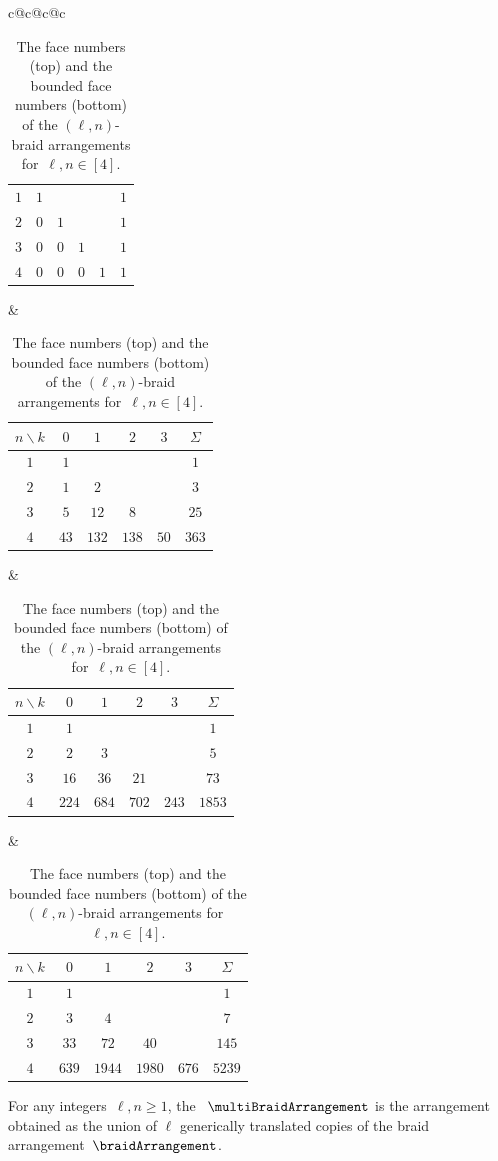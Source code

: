 \begin{table}
{{\begin{tabular}{c@{\hspace{.7cm}}c@{\hspace{.7cm}}c@{\hspace{.7cm}}c}
\begin{tabular}[t]{c|cccc|c}
				\hline
				$1$ & $1$ &&&& $1$ \\
				$2$ & $0$ & $1$ &&& $1$ \\
				$3$ & $0$ & $0$ & $1$ && $1$ \\
				$4$ & $0$ & $0$ & $0$ & $1$ & $1$
			\end{tabular}
			&
			\begin{tabular}[t]{c|cccc|c}
				$n \backslash k$ & $0$ & $1$ & $2$ & $3$ & $\Sigma$ \\
				\hline
				$1$ & $1$ &&&& $1$ \\
				$2$ & $1$ & $2$ &&& $3$ \\
				$3$ & $5$ & $12$ & $8$ && $25$ \\
				$4$ & $43$ & $132$ & $138$ & $50$ & $363$
			\end{tabular}
			&
			\begin{tabular}[t]{c|cccc|c}
				$n \backslash k$ & $0$ & $1$ & $2$ & $3$ & $\Sigma$ \\
				\hline
				$1$ & $1$ &&&& $1$ \\
				$2$ & $2$ & $3$ &&& $5$ \\
				$3$ & $16$ & $36$ & $21$ && $73$ \\
				$4$ & $224$ & $684$ & $702$ & $243$ & $1853$
			\end{tabular}
			&
			\begin{tabular}[t]{c|cccc|c}
				$n \backslash k$ & $0$ & $1$ & $2$ & $3$ & $\Sigma$ \\
				\hline
				$1$ & $1$ &&&& $1$ \\
				$2$ & $3$ & $4$ &&& $7$ \\
				$3$ & $33$ & $72$ & $40$ && $145$ \\
				$4$ & $639$ & $1944$ & $1980$ & $676$ & $5239$
			\end{tabular}
		\end{tabular}
	}}
	\vspace{.3cm}
	\caption{The face numbers (top) and the bounded face numbers (bottom) of the $(\ell,n)$-braid arrangements for~$\ell, n \in [4]$.}
	\label{table:fvectorMultiBraidArrangements}
\end{table}

\begin{definition}
For any integers~$\ell,n \geq 1$, the ~$\multiBraidArrangement$ is the arrangement obtained as the union of $\ell$ generically translated copies of the braid arrangement~$\braidArrangement$.
\end{definition}

